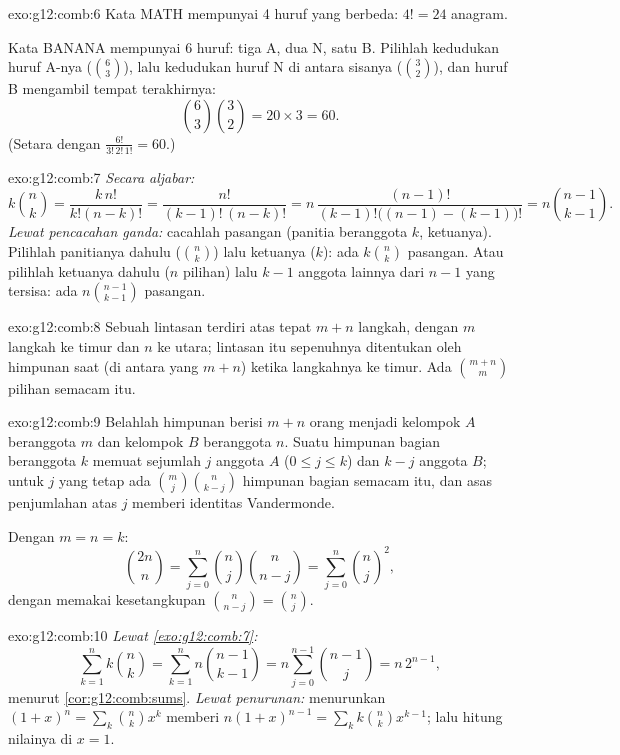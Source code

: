 \begin{solution}{exo:g12:comb:6}
Kata MATH mempunyai 4 huruf yang berbeda: $4! = 24$ anagram.

Kata BANANA mempunyai 6 huruf: tiga A, dua N, satu B. Pilihlah kedudukan
huruf A-nya ($\binom63$), lalu kedudukan huruf N di antara sisanya ($\binom32$),
dan huruf B mengambil tempat terakhirnya:
\[
\binom{6}{3}\binom{3}{2} = 20 \times 3 = 60 .
\]
(Setara dengan $\frac{6!}{3!\,2!\,1!} = 60$.)
\end{solution}

\begin{solution}{exo:g12:comb:7}
\emph{Secara aljabar:}
\[
k\binom nk = \frac{k\,n!}{k!(n-k)!} = \frac{n!}{(k-1)!\,(n-k)!}
= n\,\frac{(n-1)!}{(k-1)!\bigl((n-1)-(k-1)\bigr)!} = n\binom{n-1}{k-1}.
\]
\emph{Lewat pencacahan ganda:} cacahlah pasangan (panitia beranggota $k$, ketuanya).
Pilihlah panitianya dahulu ($\binom nk$) lalu ketuanya ($k$): ada
$k\binom nk$ pasangan. Atau pilihlah ketuanya dahulu ($n$ pilihan) lalu
$k-1$ anggota lainnya dari $n-1$ yang tersisa: ada $n\binom{n-1}{k-1}$ pasangan.
\end{solution}

\begin{solution}{exo:g12:comb:8}
Sebuah lintasan terdiri atas tepat $m + n$ langkah, dengan $m$ langkah ke timur dan
$n$ ke utara; lintasan itu sepenuhnya ditentukan oleh himpunan saat (di antara
yang $m+n$) ketika langkahnya ke timur. Ada $\binom{m+n}{m}$ pilihan semacam itu.
\end{solution}

\begin{solution}{exo:g12:comb:9}
Belahlah himpunan berisi $m + n$ orang menjadi kelompok $A$ beranggota $m$ dan
kelompok $B$ beranggota $n$. Suatu himpunan bagian beranggota $k$ memuat sejumlah
$j$ anggota $A$ ($0 \leq j \leq k$) dan $k - j$ anggota $B$; untuk $j$ yang tetap
ada $\binom mj \binom{n}{k-j}$ himpunan bagian semacam itu, dan asas penjumlahan
atas $j$ memberi identitas Vandermonde.

Dengan $m = n = k$:
\[
\binom{2n}{n} = \sum_{j=0}^n \binom nj \binom{n}{n-j}
= \sum_{j=0}^n \binom nj^{2},
\]
dengan memakai kesetangkupan $\binom{n}{n-j} = \binom nj$.
\end{solution}

\begin{solution}{exo:g12:comb:10}
\emph{Lewat \cref{exo:g12:comb:7}:}
\[
\sum_{k=1}^n k\binom nk = \sum_{k=1}^n n\binom{n-1}{k-1}
= n\sum_{j=0}^{n-1}\binom{n-1}{j} = n\,2^{n-1},
\]
menurut \cref{cor:g12:comb:sums}. \emph{Lewat penurunan:} menurunkan
$(1+x)^n = \sum_k \binom nk x^k$ memberi
$n(1+x)^{n-1} = \sum_k k \binom nk x^{k-1}$; lalu hitung nilainya di $x = 1$.
\end{solution}

